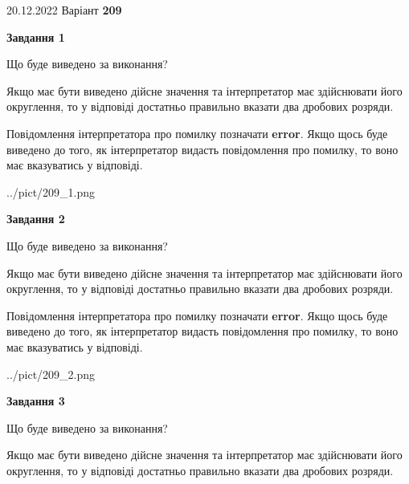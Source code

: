 \documentclass[12pt, ukrainian]{article}
\begin{document}
{20.12.2022 Варіант \No \textbf { 209 }\par}
{
\begin {Large}

{\begin {center}\textbf{Завдання 1}\end {center}}\par
Що буде виведено за виконання? \par

Якщо має бути виведено дійсне значення та інтерпретатор має здійснювати його округлення, 
то у відповіді достатньо правильно вказати два дробових розряди.

Повідомлення інтерпретатора про помилку позначати \textbf{error}.
Якщо щось буде виведено до того, як інтерпретатор видасть повідомлення про помилку, 
то воно має вказуватись у відповіді. \par

\begin{center}
	{../pict/209_1.png}
\end{center}
\newpage

{\begin {center}\textbf{Завдання 2}\end {center}}\par
Що буде виведено за виконання? \par

Якщо має бути виведено дійсне значення та інтерпретатор має здійснювати його округлення, 
то у відповіді достатньо правильно вказати два дробових розряди.

Повідомлення інтерпретатора про помилку позначати \textbf{error}.
Якщо щось буде виведено до того, як інтерпретатор видасть повідомлення про помилку, 
то воно має вказуватись у відповіді. \par

\begin{center}
	{../pict/209_2.png}
\end{center}
\newpage

{\begin {center}\textbf{Завдання 3}\end {center}}\par
Що буде виведено за виконання? \par

Якщо має бути виведено дійсне значення та інтерпретатор має здійснювати його округлення, 
то у відповіді достатньо правильно вказати два дробових розряди.


\end{Large}}
\end{document}
